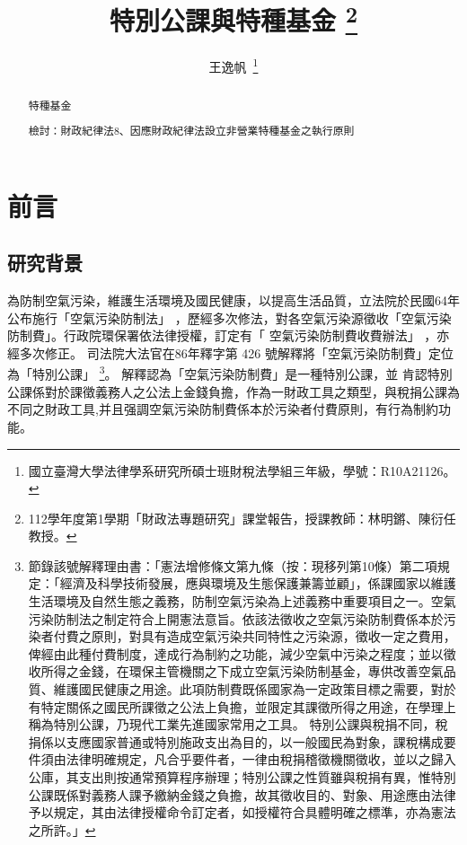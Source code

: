 \documentclass[12pt,a4paper]{article}
\author{王逸帆\,
\thanks{國立臺灣大學法律學系研究所碩士班財稅法學組三年級，學號：R10A21126。}
\vspace{-60em}
}
\date{}
\title{特別公課與特種基金
\thanks{
  112學年度第1學期「財政法專題研究」課堂報告，授課教師：林明鏘、陳衍任教授。}}
\begin{document}
\maketitle
\makeatother

\vspace{1pt}

\begin{abstract}
\setlength{\parindent}{2em}
\noindent
\hspace*{0.9\parindent}

特種基金

檢討：財政紀律法8、因應財政紀律法設立非營業特種基金之執行原則

   \end{abstract}



\thispagestyle{empty} %
\clearpage
    

\tableofcontents 


\thispagestyle{empty} %
\clearpage
\setcounter{page}{1} %

\section{前言}
\subsection{研究背景}

為防制空氣污染，維護生活環境及國民健康，以提高生活品質，立法院於民國64年公布施行「空氣污染防制法」
，歷經多次修法，對各空氣污染源徵收「空氣污染防制費」。行政院環保署依法律授權，訂定有「	空氣污染防制費收費辦法」
，亦經多次修正。
司法院大法官在86年釋字第 426 號解釋將「空氣污染防制費」定位為「特別公課」
\footnote{節錄該號解釋理由書：「憲法增修條文第九條（按：現移列第10條）第二項規定：「經濟及科學技術發展，應與環境及生態保護兼籌並顧」，係課國家以維護生活環境及自然生態之義務，防制空氣污染為上述義務中重要項目之一。空氣污染防制法之制定符合上開憲法意旨。依該法徵收之空氣污染防制費係本於污染者付費之原則，對具有造成空氣污染共同特性之污染源，徵收一定之費用，俾經由此種付費制度，達成行為制約之功能，減少空氣中污染之程度；並以徵收所得之金錢，在環保主管機關之下成立空氣污染防制基金，專供改善空氣品質、維護國民健康之用途。此項防制費既係國家為一定政策目標之需要，對於有特定關係之國民所課徵之公法上負擔，並限定其課徵所得之用途，在學理上稱為特別公課，乃現代工業先進國家常用之工具。
特別公課與稅捐不同，稅捐係以支應國家普通或特別施政支出為目的，以一般國民為對象，課稅構成要件須由法律明確規定，凡合乎要件者，一律由稅捐稽徵機關徵收，並以之歸入公庫，其支出則按通常預算程序辦理；特別公課之性質雖與稅捐有異，惟特別公課既係對義務人課予繳納金錢之負擔，故其徵收目的、對象、用途應由法律予以規定，其由法律授權命令訂定者，如授權符合具體明確之標準，亦為憲法之所許。」}。
解釋認為「空氣污染防制費」是一種特別公課，並
肯認特別公課係對於課徵義務人之公法上金錢負擔，作為一財政工具之類型，與稅捐公課為不同之財政工具,并且强調空氣污染防制費係本於污染者付費原則，有行為制約功能。
\end{document}
